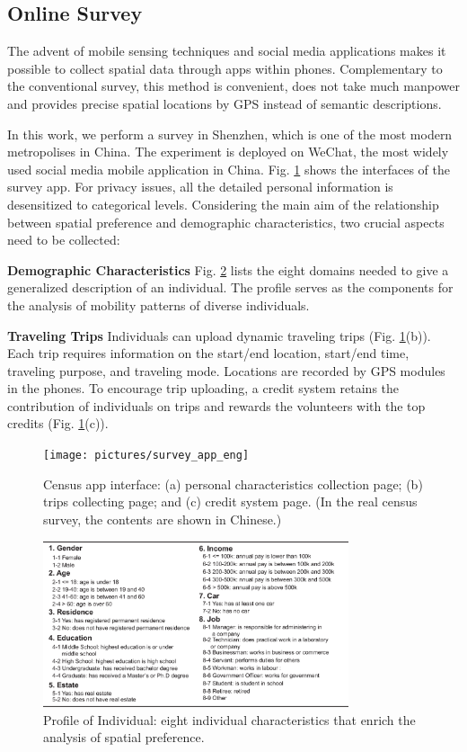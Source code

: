 \documentclass{ieeeaccess}
\begin{document}
\subsection{Online Survey}

The advent of mobile sensing techniques and social media applications makes it possible to collect spatial data through apps within phones. Complementary to the conventional survey, this method is convenient, does not take much manpower and provides precise spatial locations by GPS instead of semantic descriptions.

In this work, we perform a survey in Shenzhen, which is one of the most modern metropolises in China. The experiment is deployed on WeChat, the most widely used social media mobile application in China. Fig. \ref{fig:app} shows the interfaces of the survey app. For privacy issues, all the detailed personal information is desensitized to categorical levels. Considering the main aim of the relationship between spatial preference and demographic characteristics, two crucial aspects need to be collected:

\textbf{Demographic Characteristics} Fig. \ref{fig:data_over} lists the eight domains needed to give a generalized description of an individual. The profile serves as the components for the analysis of mobility patterns of diverse individuals.

\textbf{Traveling Trips} Individuals can upload dynamic traveling trips (Fig. \ref{fig:app}(b)). Each trip requires information on the start/end location, start/end time, traveling purpose, and traveling mode. Locations are recorded by GPS modules in the phones. To encourage trip uploading, a credit system retains the contribution of individuals on trips and rewards the volunteers with the top credits (Fig. \ref{fig:app}(c)).


\begin{figure}
 \centering
 \texttt{[image: pictures/survey\_app\_eng]}
  \captionsetup{justification=centering}
 \caption{Census app interface: (a) personal characteristics collection page; (b) trips collecting page; and (c) credit system page. (In the real census survey, the contents are shown in Chinese.)}
 \label{fig:app}
\end{figure}


\begin{figure}
 \centering
 \includegraphics[width=9cm]{pictures/data_over}
 \captionsetup{justification=centering}
 \caption{Profile of Individual: eight individual characteristics that enrich the analysis of spatial preference.}
 \label{fig:data_over}
\end{figure}
\end{document}
